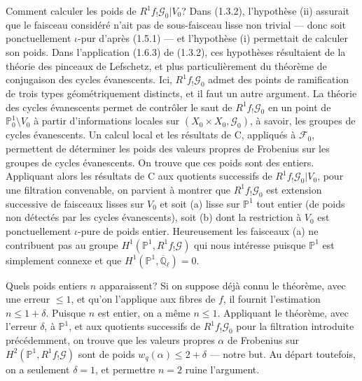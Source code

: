 \documentclass[12pt,a4paper]{article}
\theoremstyle{plain}
\theoremstyle{definition}
\theoremstyle{definition}
\theoremstyle{remark}
\begin{document}
Comment calculer les poids de $R^1 f_! \mathscr{G}_0|V_0$? Dans (1.3.2), l'hypoth\`ese (ii) assurait que le faisceau consid\'er\'e n'ait pas de sous-faisceau lisse non trivial --- donc soit ponctuellement $\iota$-pur d'apr\`es (1.5.1) --- et l'hypoth\`ese (i) permettait de calculer son poids. Dans l'application (1.6.3) de (1.3.2), ces hypoth\`eses r\'esultaient de la th\'eorie des pinceaux de Lefschetz, et plus particuli\`erement du th\'eor\`eme de conjugaison des cycles \'evanescents. Ici, $R^1 f_! \mathscr{G}_0$ admet des points de ramification de trois types g\'eom\'etriquement distincts, et il faut un autre argument. La th\'eorie des cycles \'evanescents permet de contr\^oler le saut de $R^1 f_! \mathscr{G}_0$ en un point de $\mathbb{P}_0^1 \setminus V_0$ \`a partir d'informations locales sur $(X_0 \times X_0, \mathscr{G}_0)$, \`a savoir, les groupes de cycles \'evanescents. Un calcul local et les r\'esultats de C, appliqu\'es \`a $\mathscr{F}_0$, permettent de d\'eterminer les poids des valeurs propres de Frobenius sur les groupes de cycles \'evanescents. On trouve que ces poids sont des entiers. Appliquant alors les r\'esultats de C aux quotients successifs de $R^1 f_! \mathscr{G}_0|V_0$, pour une filtration convenable, on parvient \`a montrer que $R^1 f_! \mathscr{G}_0$ est extension successive de faisceaux lisses sur $V_0$ et soit (a) lisse sur $\mathbb{P}^1$ tout entier (de poids non d\'etect\'es par les cycles \'evanescents), soit (b) dont la restriction \`a $V_0$ est ponctuellement $\iota$-pure de poids entier. Heureusement les faisceaux (a) ne contribuent pas au groupe $H^1(\mathbb{P}^1, R^1 f_! \mathscr{G})$ qui nous int\'eresse puisque $\mathbb{P}^1$ est simplement connexe et que $H^1(\mathbb{P}^1, \overline{\mathbb{Q}}_\ell) = 0$.

Quels poids entiers $n$ apparaissent? Si on suppose d\'ej\`a connu le th\'eor\`eme, avec une erreur $\leq 1$, et qu'on l'applique aux fibres de $f$, il fournit l'estimation $n \leq 1+\delta$. Puisque $n$ est entier, on a m\^eme $n \leq 1$. Appliquant le th\'eor\`eme, avec l'erreur $\delta$, \`a $\mathbb{P}^1$, et aux quotients successifs de $R^1 f_! \mathscr{G}_0$ pour la filtration introduite pr\'ec\'edemment, on trouve que les valeurs propres $\alpha$ de Frobenius sur $H^2(\mathbb{P}^1, R^1 f_! \mathscr{G})$ sont de poids $w_q(\alpha) \leq 2 + \delta$ --- notre but. Au d\'epart toutefois, on a seulement $\delta = 1$, et permettre $n = 2$ ruine l'argument.
\end{document}

